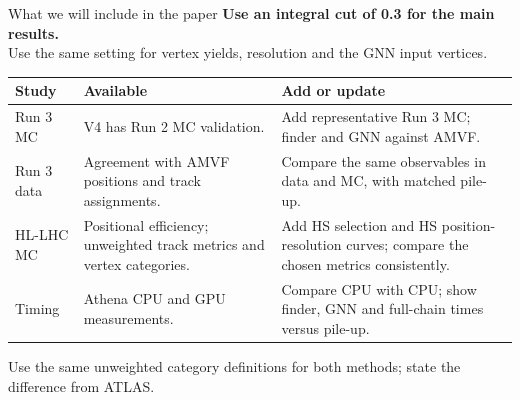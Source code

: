 \documentclass[xcolor=table,aspectratio=169]{beamer}
\begin{document}
\begin{frame}{What we will include in the paper}
\small
\textbf{Use an integral cut of 0.3 for the main results.}\\[.4em]
Use the same setting for vertex yields, resolution and the GNN input vertices.
\par\vspace{.6em}
\centering\footnotesize\renewcommand{\arraystretch}{1.2}
\begin{tabular}{p{2.1cm}p{4.35cm}p{6.35cm}}
\toprule
Study & Available & Add or update\\
\midrule
Run 3 MC & V4 has Run 2 MC validation. & Add representative Run 3 MC; finder and GNN against AMVF.\\
Run 3 data & Agreement with AMVF positions and track assignments. & Compare the same observables in data and MC, with matched pile-up.\\
HL-LHC MC & Positional efficiency; unweighted track metrics and vertex categories. & Add HS selection and HS position-resolution curves; compare the chosen metrics consistently.\\
Timing & Athena CPU and GPU measurements. & Compare CPU with CPU; show finder, GNN and full-chain times versus pile-up.\\
\bottomrule
\end{tabular}
\par\vspace{.5em}\raggedright\small
Use the same unweighted category definitions for both methods; state the difference from ATLAS.
\end{frame}
\end{document}
